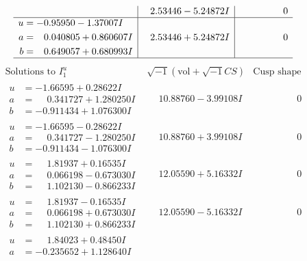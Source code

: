 \documentclass[1p]{elsarticle_modified}
\theoremstyle{definition}
\newcommand{\I}{\sqrt{-1}}
\begin{document}
$$\begin{array}{c|c|c}
 & \phantom{-}2.53446 - 5.24872 I & \phantom{-0.000000 } 0 \\ \hline\begin{aligned}
u &= -0.95950 - 1.37007 I \\
a &= \phantom{-}0.040805 + 0.860607 I \\
b &= \phantom{-}0.649057 + 0.680993 I\end{aligned}
 & \phantom{-}2.53446 + 5.24872 I & \phantom{-0.000000 } 0\\
 \hline 
 \end{array}$$\newpage$$\begin{array}{c|c|c}  
\text{Solutions to }I^u_{1}& \I (\text{vol} + \sqrt{-1}CS) & \text{Cusp shape}\\
 \hline 
\begin{aligned}
u &= -1.66595 + 0.28622 I \\
a &= \phantom{-}0.341727 + 1.280250 I \\
b &= -0.911434 + 1.076300 I\end{aligned}
 & \phantom{-}10.88760 - 3.99108 I & \phantom{-0.000000 } 0 \\ \hline\begin{aligned}
u &= -1.66595 - 0.28622 I \\
a &= \phantom{-}0.341727 - 1.280250 I \\
b &= -0.911434 - 1.076300 I\end{aligned}
 & \phantom{-}10.88760 + 3.99108 I & \phantom{-0.000000 } 0 \\ \hline\begin{aligned}
u &= \phantom{-}1.81937 + 0.16535 I \\
a &= \phantom{-}0.066198 - 0.673030 I \\
b &= \phantom{-}1.102130 - 0.866233 I\end{aligned}
 & \phantom{-}12.05590 + 5.16332 I & \phantom{-0.000000 } 0 \\ \hline\begin{aligned}
u &= \phantom{-}1.81937 - 0.16535 I \\
a &= \phantom{-}0.066198 + 0.673030 I \\
b &= \phantom{-}1.102130 + 0.866233 I\end{aligned}
 & \phantom{-}12.05590 - 5.16332 I & \phantom{-0.000000 } 0 \\ \hline\begin{aligned}
u &= \phantom{-}1.84023 + 0.48450 I \\
a &= -0.235652 + 1.128640 I \\

\end{aligned}
\end{array}$$
\end{document}
